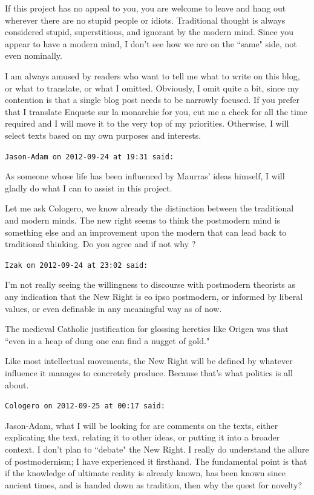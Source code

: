\begin{footnotesize}
\begin{sffamily}
If this project has no appeal to you, you are welcome to leave and hang out wherever there are no stupid people or idiots. Traditional thought is always considered stupid, superstitious, and ignorant by the modern mind. Since you appear to have a modern mind, I don't see how we are on the ``same" side, not even nominally.

I am always amused by readers who want to tell me what to write on this blog, or what to translate, or what I omitted. Obviously, I omit quite a bit, since my contention is that a single blog post needs to be narrowly focused. If you prefer that I translate Enquete sur la monarchie for you, cut me a check for all the time required and I will move it to the very top of my priorities. Otherwise, I will select texts based on my own purposes and interests.


\hfill

\texttt{Jason-Adam on 2012-09-24 at 19:31 said: }

As someone whose life has been influenced by Maurras' ideas himself, I will gladly do what I can to assist in this project.

Let me ask Cologero, we know already the distinction between the traditional and modern minds. The new right seems to think the postmodern mind is something else and an improvement upon the modern that can lead back to traditional thinking. Do you agree and if not why ?


\hfill

\texttt{Izak on 2012-09-24 at 23:02 said: }

I'm not really seeing the willingness to discourse with postmodern theorists as any indication that the New Right is eo ipso postmodern, or informed by liberal values, or even definable in any meaningful way as of now.

The medieval Catholic justification for glossing heretics like Origen was that ``even in a heap of dung one can find a nugget of gold." 

Like most intellectual movements, the New Right will be defined by whatever influence it manages to concretely produce. Because that's what politics is all about.


\hfill

\texttt{Cologero on 2012-09-25 at 00:17 said: }

Jason-Adam, what I will be looking for are comments on the texts, either explicating the text, relating it to other ideas, or putting it into a broader context. I don't plan to ``debate" the New Right. I really do understand the allure of postmodernism; I have experienced it firsthand. The fundamental point is that if the knowledge of ultimate reality is already known, has been known since ancient times, and is handed down as tradition, then why the quest for novelty? 


\end{sffamily}
\end{footnotesize}
